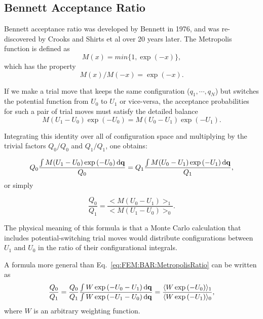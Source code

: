 \subsection{Bennett Acceptance Ratio\label{Sec:FEM:BAR}}
Bennett acceptance ratio was developed by Bennett in 1976,\cite{BennettJComputPhys1976} and was re-discovered by Crooks\cite{CrooksPRE2000} and Shirts et al\cite{ShirtsPRL2003} over 20 years later. The Metropolis function is defined as
\begin{equation}
	M(x)=min\{1,\exp{(-x)}\},
\end{equation}
which has the property 
\begin{equation}
	M(x)/M(-x)=\exp{(-x)}.
\end{equation}

If we make a trial move that keeps the same configuration ($q_{1},\cdots,q_{N}$)
but switches the potential function from $U_{0}$ to $U_{1}$ or vice-versa, 
the acceptance probabilities for such a pair of trial moves must satisfy
the detailed balance
\begin{equation}
	M(U_{1}-U_{0})\exp{(-U_{0})}=M(U_{0}-U_{1})\exp{(-U_{1})}.
\end{equation}

Integrating this identity over all of configuration space and multiplying
by the trivial factors $Q_{0}/Q_{0}$ and $Q_{1}/Q_{1}$, one obtains:

\begin{equation}
	Q_{0}\frac{\int M(U_{1}-U_{0})\exp{(-U_{0})}\mathop{}\!\mathrm{d}\mathbf{{q}}}{Q_{0}}=Q_{1}\frac{\int M(U_{0}-U_{1})\exp{(-U_{1})}\mathop{}\!\mathrm{d}\mathbf{{q}}}{Q_{1}},
\end{equation}
or simply

\begin{equation}
	\frac{Q_{0}}{Q_{1}}=\frac{<M(U_{0}-U_{1})>_{1}}{<M(U_{1}-U_{0})>_{0}}.\label{eq:FEM:BAR:MetropolisRatio}
\end{equation}

The physical meaning of this formula is that a Monte Carlo calculation
that includes potential-switching trial moves would distribute configurations
between $U_{1}$ and $U_{0}$ in the ratio of their configurational
integrals. 

A formula more general than Eq.~\ref{eq:FEM:BAR:MetropolisRatio} can be written
as
\begin{equation}
	\frac{Q_{0}}{Q_{1}}=\frac{Q_{0}}{Q_{1}}\frac{\int W\exp{(-U_{0}-U_{1})}\mathop{}\!\mathrm{d}\mathbf{{q}}}{\int W\exp{(-U_{1}-U_{0})}\mathop{}\!\mathrm{d}\mathbf{{q}}}=\frac{\langle W\exp{(-U_{0})}\rangle_{1}}{\langle W\exp{(-U_{1})}\rangle_{0}},\label{eq:FEM:BAR:weightedratio}
\end{equation}
where $W$ is an arbitrary weighting function.

